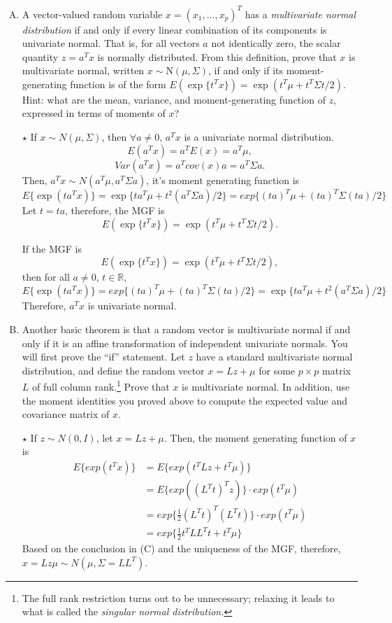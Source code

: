 \documentclass[11pt]{article}
\newcommand{\jie}{$\star$ }
\newcommand{\half}{\frac{1}{2}}
\newcommand{\N}{\mbox{N}}
\begin{document}
\begin{enumerate}[(A)]
\bigskip

\item A vector-valued random variable $x = (x_1, \ldots, x_p)^T$ has a \textit{multivariate normal distribution} if and only if every linear combination of its components is univariate normal.  That is, for all vectors $a$ not identically zero, the scalar quantity $z = a^T x$ is normally distributed.  From this definition, prove that $x$ is multivariate normal, written $x \sim \N(\mu, \Sigma)$, if and only if its moment-generating function is of the form $E(\exp \{t^T x\}) = \exp(t^T \mu + t^T \Sigma t / 2)$.  Hint: what are the mean, variance, and moment-generating function of $z$, expressed in terms of moments of $x$?

\bigskip

\jie
If $x \sim N(\mu,\Sigma)$, then $\forall a \neq 0$, $a^Tx$ is a univariate normal distribution.
$$E(a^Tx) = a^TE(x) = a^T\mu,$$
$$Var(a^Tx) = a^T cov(x) a = a^T \Sigma a.$$
Then, $a^T x \sim N(a^T\mu,a^T \Sigma a)$, it's moment generating function is
$$E\{\exp(ta^Tx)\} = \exp\{ta^T\mu + t^2(a^T\Sigma a)/2\} = exp\{ (ta)^T \mu + (ta)^T \Sigma (ta)/2\} $$
Let $t= ta$, therefore, the MGF is
$$E(\exp \{t^T x\}) = \exp(t^T \mu + t^T \Sigma t / 2).$$

If the MGF is
$$E(\exp \{t^T x\}) = \exp(t^T \mu + t^T \Sigma t / 2),$$
then for all $a \neq 0$, $t \in \mathbb{R}$,
$$E\{\exp(ta^Tx)\} = exp\{ (ta)^T \mu + (ta)^T \Sigma (ta)/2\} = \exp\{ta^T\mu + t^2(a^T\Sigma a)/2\} $$
Therefore, $a^T x $ is univariate normal.

\bigskip

\item Another basic theorem is that a random vector is multivariate normal if and only if it is an affine transformation of independent univariate normals.  You will first prove the ``if'' statement.  Let $z$ have a standard multivariate normal distribution, and define the random vector $x = L z + \mu$ for some $p \times p$ matrix $L$ of full column rank.\footnote{The full rank restriction turns out to be unnecessary; relaxing it leads to what is called the \textit{singular normal distribution.}}   Prove that $x$ is multivariate normal.  In addition, use the moment identities you proved above to compute the expected value and covariance matrix of $x$.  

\bigskip

\jie
If $z \sim N(0,I)$, let $x = Lz + \mu$. Then, the moment generating function of $x$ is
\begin{align*}
	E\{ exp(t^T x) \} &= E\{ exp(t^T Lz + t^T \mu) \} \\
	&= E\{exp((L^Tt)^Tz)\} \cdot exp(t^T\mu) \\
	&= exp\{ \half (L^Tt)^T(L^Tt)\} \cdot exp(t^T\mu) \\
	&= exp\{ \half t^TLL^Tt+t^T\mu \}
\end{align*}
Based on the conclusion in (C) and the uniqueness of the MGF, therefore, $x = Lz \mu \sim N(\mu,\Sigma=LL^T)$.


\end{enumerate}
\end{document}
